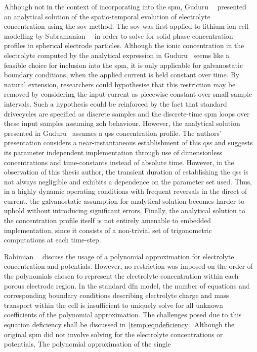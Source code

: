 Although   not   in  the   context   of   incorporating  into   the   \gls{spm},
Guduru~\etal~\cite{Guduru2012}   presented  an   analytical   solution  of   the
spatio-temporal  evolution  of  electrolyte concentration  using  the  \gls{sov}
method.  The \gls{sov}  was  first  applied to  lithium  ion  cell modelling  by
Subramanian~\etal~\cite{Subramanian2001a}  in order  to  solve  for solid  phase
concentration  profiles in  spherical  electrode particles.  Although the  ionic
concentration  in  the electrolyte  computed  by  the analytical  expression  in
Guduru~\etal{} seems like a feasible choice for inclusion into the \gls{spm}, it
is only applicable for galvanostatic boundary conditions, \ie{} when the applied
current  is held  constant over  time. By  natural extension,  researchers could
hypothesise  that this  restriction  may  be removed  by  considering the  input
current as  piecewise constant  over small sample  intervals. Such  a hypothesis
could  be reinforced  by the  fact that  standard drivecycles  are specified  as
discrete  samples  and  the  discrete-time  \gls{spm}  loops  over  these  input
samples assuming \gls{zoh} behaviour. However, the analytical solution presented
in  Guduru~\etal{}  assumes  a  \gls{qss} concentration  profile.  The  authors'
presentation considers a near-instantaneous  establishment of this \gls{qss} and
suggests its  parameter independent implementation through  use of dimensionless
concentrations  and time-constants  instead of  absolute time.  However, in  the
observation  of  this  thesis author, the transient duration of establishing the \gls{qss} is not
always negligible and exhibits a dependence  on the parameter set used. Thus, in
a highly dynamic  operating conditions with frequent reversals in  the direct of
current, the galvanostatic assumption for  analytical solution becomes harder to
uphold without introducing significant  errors. Finally, the analytical solution
to  the  concentration profile  itself  is  not  entirely amenable  to  embedded
implementation,  since  it  consists  of  a  non-trivial  set  of  trigonometric
computations at each time-step.


Rahimian~\etal{}~\cite{KhaleghiRahimian2013} discuss  the usage of  a polynomial
approximation  for   electrolyte  concentration  and  potentials.   However,  no
restriction was imposed on the order  of the polynomials chosen to represent the
electrolyte concentration within  each porous electrode region.  In the standard
\gls{dfn} model, the  number of equations and  corresponding boundary conditions
describing electrolyte charge and mass transport within the cell is insufficient
to uniquely solve for all  unknown coefficients of the polynomial approximation.
The  challenges  posed  due  to  this equation  deficiency  shall  be  discussed
in~\cref{temp:eqndeficiency}. Although  the original  \gls{spm} did  not involve
solving  for  the  electrolyte  concentrations  or  potentials,  The  polynomial
approximation of the single


